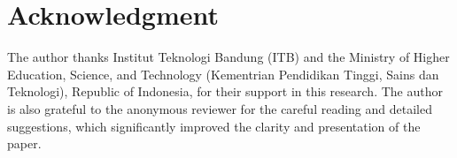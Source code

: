 \documentclass[11pt]{article}
\numberwithin{equation}{section}
\begin{document}
\section*{Acknowledgment}

The author thanks Institut Teknologi Bandung (ITB) and the Ministry of Higher Education, Science, and Technology (Kementrian Pendidikan Tinggi, Sains dan Teknologi), Republic of Indonesia, for their support in this research.
The author is also grateful to the anonymous reviewer for the careful reading and detailed suggestions, which significantly improved the clarity and presentation of the paper.




\end{document}
